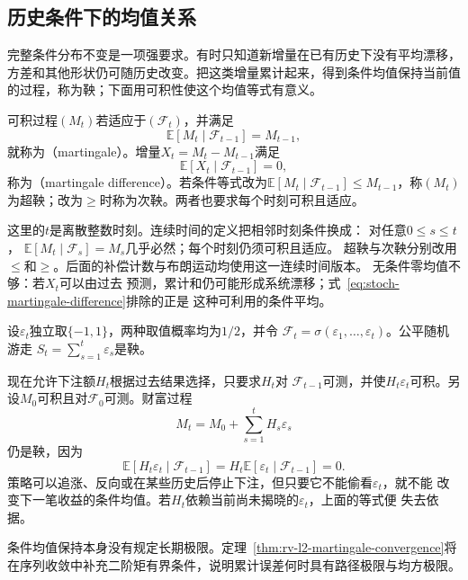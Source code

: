 \subsection{历史条件下的均值关系}

完整条件分布不变是一项强要求。有时只知道新增量在已有历史下没有平均漂移，方差和其他形状仍可随历史改变。把这类增量累计起来，得到条件均值保持当前值的过程，称为鞅；下面用可积性使这个均值等式有意义。
\label{sec:rv-martingales}
\begin{definition}[鞅与鞅差]
  \label{def:stoch-martingale}
可积过程$(M_t)$若适应于$(\mathcal{F}_t)$，并满足
\begin{equation}
  \mathbb{E}[M_t\mid\mathcal{F}_{t-1}]=M_{t-1},
  \label{eq:stoch-martingale-definition}
\end{equation}
就称为（martingale）。增量$X_t=M_t-M_{t-1}$满足
\begin{equation}
  \mathbb{E}[X_t\mid\mathcal{F}_{t-1}]=0,
  \label{eq:stoch-martingale-difference}
\end{equation}
称为（martingale difference）。若条件等式改为\(\mathbb E[M_t\mid\mathcal F_{t-1}]\leq M_{t-1}\)，称\((M_t)\)为超鞅；改为\(\geq\)时称为次鞅。两者也要求每个时刻可积且适应。
\end{definition}
这里的\(t\)是离散整数时刻。连续时间的定义把相邻时刻条件换成：
对任意\(0\leq s\leq t\)，
\(\mathbb E[M_t\mid\mathcal F_s]=M_s\)几乎必然；每个时刻仍须可积且适应。
超鞅与次鞅分别改用\(\leq\)和\(\geq\)。后面的补偿计数与布朗运动均使用这一连续时间版本。
无条件零均值不够：若$X_t$可以由过去
预测，累计和仍可能形成系统漂移；式~\eqref{eq:stoch-martingale-difference}排除的正是
这种可利用的条件平均。

\begin{example}[公平随机游走与按过去下注]
  \label{ex:stoch-predictable-betting}
  设$\varepsilon_t$独立取$\{-1,1\}$，两种取值概率均为$1/2$，并令
  $\mathcal{F}_t=\sigma(\varepsilon_1,\ldots,\varepsilon_t)$。公平随机游走
  $S_t=\sum_{s=1}^{t}\varepsilon_s$是鞅。

  现在允许下注额$H_t$根据过去结果选择，只要求$H_t$对
  $\mathcal{F}_{t-1}$可测，并使$H_t\varepsilon_t$可积。另设\(M_0\)可积且对\(\mathcal F_0\)可测。财富过程
  \[
    M_t=M_0+\sum_{s=1}^{t}H_s\varepsilon_s
  \]
  仍是鞅，因为
  \[
    \mathbb{E}[H_t\varepsilon_t\mid\mathcal{F}_{t-1}]
    =
    H_t\mathbb{E}[\varepsilon_t\mid\mathcal{F}_{t-1}]
    =0.
  \]
  策略可以追涨、反向或在某些历史后停止下注，但只要它不能偷看$\varepsilon_t$，就不能
  改变下一笔收益的条件均值。若$H_t$依赖当前尚未揭晓的$\varepsilon_t$，上面的等式便
  失去依据。
\end{example}
条件均值保持本身没有规定长期极限。定理~\ref{thm:rv-l2-martingale-convergence}将在序列收敛中补充二阶矩有界条件，说明累计误差何时具有路径极限与均方极限。

